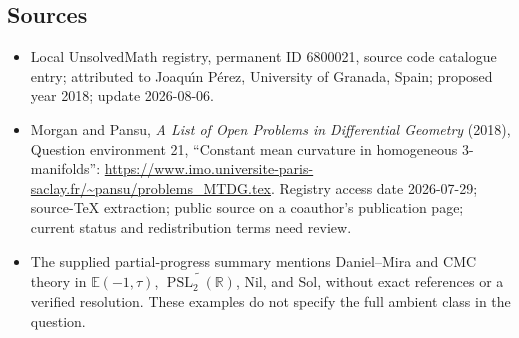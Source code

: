 \documentclass[11pt]{article}
\newcommand{\R}{\mathbb{R}}
\begin{document}
\subsection{Sources}
\begin{itemize}
\item Local UnsolvedMath registry, permanent ID 6800021, source code catalogue entry; attributed to Joaqu\'\i n P\'erez, University of Granada, Spain; proposed year 2018; update 2026-08-06.
\item Morgan and Pansu, \emph{A List of Open Problems in Differential Geometry} (2018), Question environment 21, ``Constant mean curvature in homogeneous 3-manifolds'': \url{https://www.imo.universite-paris-saclay.fr/~pansu/problems_MTDG.tex}. Registry access date 2026-07-29; source-TeX extraction; public source on a coauthor's publication page; current status and redistribution terms need review.
\item The supplied partial-progress summary mentions Daniel--Mira and CMC theory in \(\mathbb E(-1,\tau)\), \(\widetilde{\operatorname{PSL}_2(\R)}\), Nil, and Sol, without exact references or a verified resolution. These examples do not specify the full ambient class in the question.
\end{itemize}
\end{document}
